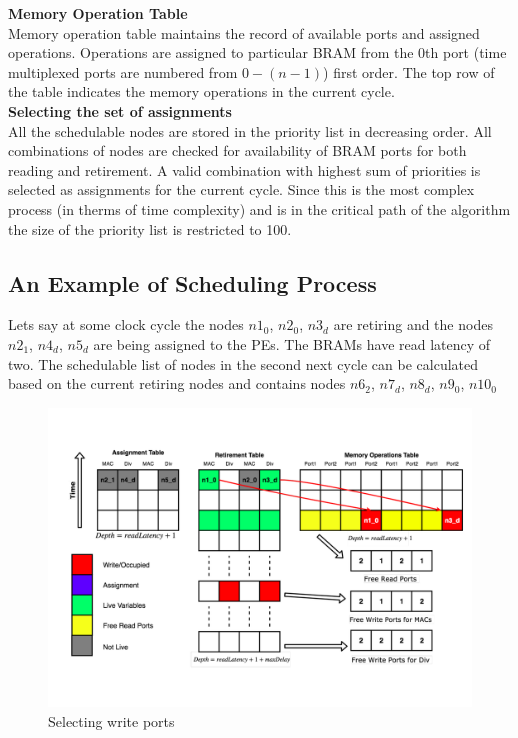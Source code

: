 \textbf{Memory Operation Table} \\
Memory operation table maintains the record of available ports and assigned operations. 
Operations are assigned to particular BRAM from the 0th port (time multiplexed ports 
are numbered from $0-(n-1)$) first order. The top row of the table indicates the memory 
operations in the current cycle.\\

\textbf{Selecting the set of assignments} \\
All the schedulable nodes are stored in the priority list in decreasing order. All combinations of nodes are 
checked for availability of BRAM ports for both reading and retirement. A valid combination with
highest sum of priorities is selected as assignments for the current cycle. Since this is the most
complex process (in therms of time complexity) and is in the critical path of the algorithm the size 
of the priority list is restricted to 100. 




\subsection{An Example of Scheduling Process}
Lets say at some clock cycle the nodes $n1_0$, $n2_0$, $n3_d$ are retiring 
and the nodes $n2_1$, $n4_d$, $n5_d$ are being assigned to the PEs. The BRAMs have read latency of two.
The schedulable list of nodes in the second next cycle can be calculated based on the current retiring nodes
and contains nodes $n6_2$, $n7_d$, $n8_d$, $n9_0$, $n10_0$

\begin{figure}
    \centering
    \includegraphics[width = \linewidth]{./Scheduler/exampleWrite.pdf}
    \caption{Selecting write ports}
    \label{fig:sch:exampleWrite}
\end{figure}

